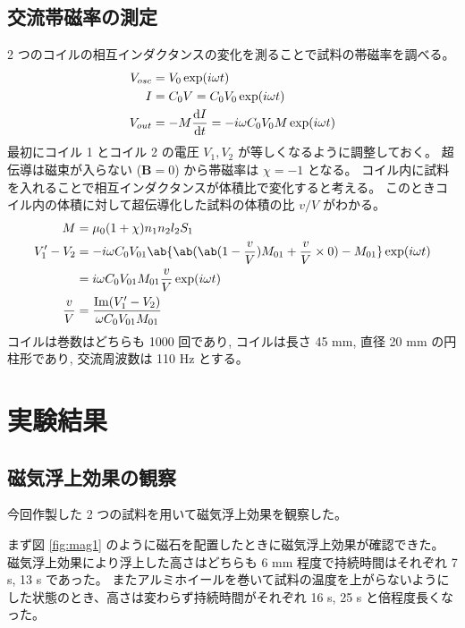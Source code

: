 \documentclass[uplatex,dvipdfmx,a4paper,11pt]{jlreq}
\numberwithin{equation}{section}
\theoremstyle{definition}
\begin{document}
\subsection{交流帯磁率の測定}
2 つのコイルの相互インダクタンスの変化を測ることで試料の帯磁率を調べる。
\begin{align}
  V_{osc} & = V_0\exp(i\omega t)                              \\
  I       & = C_0V = C_0V_0\exp(i\omega t)                    \\
  V_{out} & = -M\diff{I}{t} = -i\omega C_0V_0M\exp(i\omega t)
\end{align}
最初にコイル 1 とコイル 2 の電圧 $V_1, V_2$ が等しくなるように調整しておく。
超伝導は磁束が入らない ($\bm{B} = 0$) から帯磁率は $\chi = -1$ となる。
コイル内に試料を入れることで相互インダクタンスが体積比で変化すると考える。
このときコイル内の体積に対して超伝導化した試料の体積の比 $v/V$ がわかる。
\begin{align}
  M           & = \mu_0(1 + \chi)n_1n_2l_2S_1                                                                            \\
  V_1' - V_2  & = -i\omega C_0V_{01}\ab\{\ab(\ab(1 - \frac{v}{V})M_{01} + \frac{v}{V}\times 0) - M_{01}\}\exp(i\omega t) \\
              & = i\omega C_0V_{01}M_{01}\frac{v}{V}\exp(i\omega t)                                                      \\
  \frac{v}{V} & = \frac{\mathrm{Im} (V_1' - V_2)}{\omega C_0V_{01}M_{01}}
\end{align}
コイルは巻数はどちらも 1000 回であり, コイルは長さ 45 \si{mm}, 直径 20 \si{mm} の円柱形であり, 交流周波数は 110 \si{Hz} とする。




\section{実験結果}
\subsection{磁気浮上効果の観察}
今回作製した 2 つの試料を用いて磁気浮上効果を観察した。

まず図 \ref{fig:mag1} のように磁石を配置したときに磁気浮上効果が確認できた。
磁気浮上効果により浮上した高さはどちらも 6 \si{mm} 程度で持続時間はそれぞれ 7 \si{s}, 13 \si{s} であった。
またアルミホイールを巻いて試料の温度を上がらないようにした状態のとき、高さは変わらず持続時間がそれぞれ 16 \si{s}, 25 \si{s} と倍程度長くなった。
\end{document}
